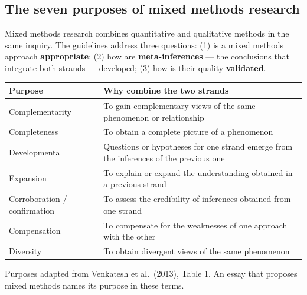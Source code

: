 \documentclass[11pt,a4paper,british,twoside=false,headings=small,chapterprefix=false,numbers=noenddot]{scrbook}
\begin{document}
\subsection{The seven purposes of mixed methods research}
\begin{center}\small
\small Mixed methods research combines quantitative and qualitative methods
  in the same inquiry. The guidelines address three questions: (1) is a mixed
  methods approach \textbf{appropriate}; (2) how are \textbf{meta-inferences}
  --- the conclusions that integrate both strands --- developed; (3) how is
  their quality \textbf{validated}.
  
  \footnotesize
  \renewcommand{\arraystretch}{1.15}
  \begin{tabular}{@{}p{3.2cm}p{9.8cm}@{}}
    \toprule
    \textbf{Purpose} & \textbf{Why combine the two strands}\\
    \midrule
    Complementarity & To gain complementary views of the same phenomenon or relationship\\
    Completeness & To obtain a complete picture of a phenomenon\\
    Developmental & Questions or hypotheses for one strand emerge from the inferences of the previous one\\
    Expansion & To explain or expand the understanding obtained in a previous strand\\
    Corroboration / confirmation & To assess the credibility of inferences obtained from one strand\\
    Compensation & To compensate for the weaknesses of one approach with the other\\
    Diversity & To obtain divergent views of the same phenomenon\\
    \bottomrule
  \end{tabular}
  

  {\color{uiagrey}\scriptsize Purposes adapted from Venkatesh et al.\ (2013), Table 1. An essay that proposes mixed methods names its purpose in these terms.}
\end{center}
\end{document}
